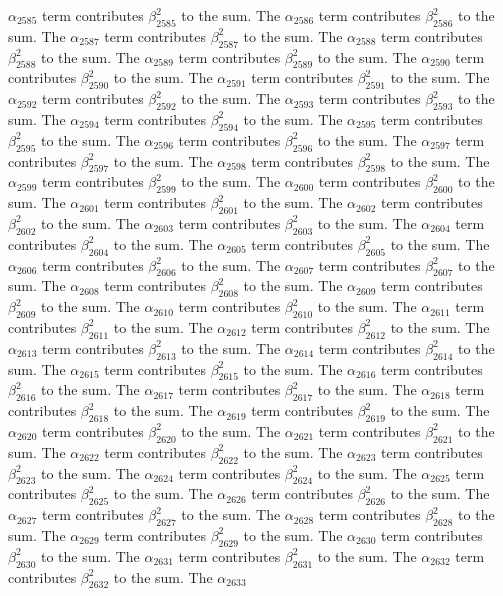 \begin{lemma}
$\alpha_{2585}$ term contributes $\beta_{2585}^{2}$ to the sum. The $\alpha_{2586}$ term contributes $\beta_{2586}^{2}$ to the sum. The $\alpha_{2587}$ term contributes $\beta_{2587}^{2}$ to the sum. The $\alpha_{2588}$ term contributes $\beta_{2588}^{2}$ to the sum. The $\alpha_{2589}$ term contributes $\beta_{2589}^{2}$ to the sum. The $\alpha_{2590}$ term contributes $\beta_{2590}^{2}$ to the sum. The $\alpha_{2591}$ term contributes $\beta_{2591}^{2}$ to the sum. The $\alpha_{2592}$ term contributes $\beta_{2592}^{2}$ to the sum. The $\alpha_{2593}$ term contributes $\beta_{2593}^{2}$ to the sum. The $\alpha_{2594}$ term contributes $\beta_{2594}^{2}$ to the sum. The $\alpha_{2595}$ term contributes $\beta_{2595}^{2}$ to the sum. The $\alpha_{2596}$ term contributes $\beta_{2596}^{2}$ to the sum. The $\alpha_{2597}$ term contributes $\beta_{2597}^{2}$ to the sum. The $\alpha_{2598}$ term contributes $\beta_{2598}^{2}$ to the sum. The $\alpha_{2599}$ term contributes $\beta_{2599}^{2}$ to the sum. The $\alpha_{2600}$ term contributes $\beta_{2600}^{2}$ to the sum. The $\alpha_{2601}$ term contributes $\beta_{2601}^{2}$ to the sum. The $\alpha_{2602}$ term contributes $\beta_{2602}^{2}$ to the sum. The $\alpha_{2603}$ term contributes $\beta_{2603}^{2}$ to the sum. The $\alpha_{2604}$ term contributes $\beta_{2604}^{2}$ to the sum. The $\alpha_{2605}$ term contributes $\beta_{2605}^{2}$ to the sum. The $\alpha_{2606}$ term contributes $\beta_{2606}^{2}$ to the sum. The $\alpha_{2607}$ term contributes $\beta_{2607}^{2}$ to the sum. The $\alpha_{2608}$ term contributes $\beta_{2608}^{2}$ to the sum. The $\alpha_{2609}$ term contributes $\beta_{2609}^{2}$ to the sum. The $\alpha_{2610}$ term contributes $\beta_{2610}^{2}$ to the sum. The $\alpha_{2611}$ term contributes $\beta_{2611}^{2}$ to the sum. The $\alpha_{2612}$ term contributes $\beta_{2612}^{2}$ to the sum. The $\alpha_{2613}$ term contributes $\beta_{2613}^{2}$ to the sum. The $\alpha_{2614}$ term contributes $\beta_{2614}^{2}$ to the sum. The $\alpha_{2615}$ term contributes $\beta_{2615}^{2}$ to the sum. The $\alpha_{2616}$ term contributes $\beta_{2616}^{2}$ to the sum. The $\alpha_{2617}$ term contributes $\beta_{2617}^{2}$ to the sum. The $\alpha_{2618}$ term contributes $\beta_{2618}^{2}$ to the sum. The $\alpha_{2619}$ term contributes $\beta_{2619}^{2}$ to the sum. The $\alpha_{2620}$ term contributes $\beta_{2620}^{2}$ to the sum. The $\alpha_{2621}$ term contributes $\beta_{2621}^{2}$ to the sum. The $\alpha_{2622}$ term contributes $\beta_{2622}^{2}$ to the sum. The $\alpha_{2623}$ term contributes $\beta_{2623}^{2}$ to the sum. The $\alpha_{2624}$ term contributes $\beta_{2624}^{2}$ to the sum. The $\alpha_{2625}$ term contributes $\beta_{2625}^{2}$ to the sum. The $\alpha_{2626}$ term contributes $\beta_{2626}^{2}$ to the sum. The $\alpha_{2627}$ term contributes $\beta_{2627}^{2}$ to the sum. The $\alpha_{2628}$ term contributes $\beta_{2628}^{2}$ to the sum. The $\alpha_{2629}$ term contributes $\beta_{2629}^{2}$ to the sum. The $\alpha_{2630}$ term contributes $\beta_{2630}^{2}$ to the sum. The $\alpha_{2631}$ term contributes $\beta_{2631}^{2}$ to the sum. The $\alpha_{2632}$ term contributes $\beta_{2632}^{2}$ to the sum. The $\alpha_{2633}$ 
\end{lemma}
